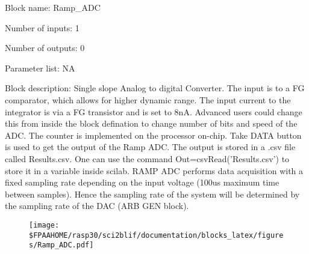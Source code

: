 \pagebreak

Block name: Ramp\_ADC

Number of inputs: 1

Number of outputs: 0

Parameter list: NA

Block description: 
Single slope Analog to digital Converter. The input is to a FG comparator, which allows for higher dynamic range. The input current to the integrator is via a FG transistor and is set to 8nA.
Advanced users could change this from inside the block defination to change number of bits and speed of the ADC. The counter is implemented on the processor on-chip. Take DATA button is used to get the output of the Ramp ADC.
The output is stored in a .csv file called Results.csv. One can use the command Out=csvRead('Results.csv') to store it in a variable inside scilab. RAMP ADC performs data acquisition with a fixed sampling rate depending on the input voltage (100us maximum time between samples).
Hence the sampling rate of the system will be determined by the sampling rate of the DAC (ARB GEN block). 

\begin{figure}[H]  %
\texttt{[image: \$FPAAHOME/rasp30/sci2blif/documentation/blocks\_latex/figures/Ramp\_ADC.pdf]}
\end{figure}

